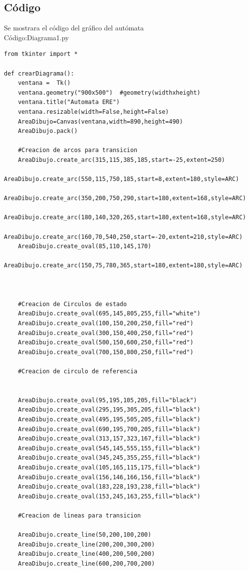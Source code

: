 \documentclass[12pt,letterpaper]{article}
\begin{document}
\subsection{C\'odigo}
Se mostrara el c\'odigo del gr\'afico del aut\'omata\\
C\'odigo:Diagrama1.py
\lstset{language=Python, breaklines=true, basicstyle=\footnotesize}
\begin{lstlisting}[frame=single]
from tkinter import *

def crearDiagrama():
	ventana =  Tk()
	ventana.geometry("900x500")  #geometry(widthxheight)
	ventana.title("Automata ERE")
	ventana.resizable(width=False,height=False)
	AreaDibujo=Canvas(ventana,width=890,height=490)
	AreaDibujo.pack()

	#Creacion de arcos para transicion
	AreaDibujo.create_arc(315,115,385,185,start=-25,extent=250)
	AreaDibujo.create_arc(550,115,750,185,start=8,extent=180,style=ARC)
	AreaDibujo.create_arc(350,200,750,290,start=180,extent=168,style=ARC)
	AreaDibujo.create_arc(180,140,320,265,start=180,extent=168,style=ARC)
	AreaDibujo.create_arc(160,70,540,250,start=-20,extent=210,style=ARC)
	AreaDibujo.create_oval(85,110,145,170)
	AreaDibujo.create_arc(150,75,780,365,start=180,extent=180,style=ARC)

	

	#Creacion de Circulos de estado
	AreaDibujo.create_oval(695,145,805,255,fill="white")
	AreaDibujo.create_oval(100,150,200,250,fill="red")
	AreaDibujo.create_oval(300,150,400,250,fill="red")
	AreaDibujo.create_oval(500,150,600,250,fill="red")
	AreaDibujo.create_oval(700,150,800,250,fill="red")
	
	#Creacion de circulo de referencia


	AreaDibujo.create_oval(95,195,105,205,fill="black")
	AreaDibujo.create_oval(295,195,305,205,fill="black")
	AreaDibujo.create_oval(495,195,505,205,fill="black")
	AreaDibujo.create_oval(690,195,700,205,fill="black")
	AreaDibujo.create_oval(313,157,323,167,fill="black")
	AreaDibujo.create_oval(545,145,555,155,fill="black")
	AreaDibujo.create_oval(345,245,355,255,fill="black")
	AreaDibujo.create_oval(105,165,115,175,fill="black")
	AreaDibujo.create_oval(156,146,166,156,fill="black")
	AreaDibujo.create_oval(183,228,193,238,fill="black")
	AreaDibujo.create_oval(153,245,163,255,fill="black")

	#Creacion de lineas para transicion

	AreaDibujo.create_line(50,200,100,200)
	AreaDibujo.create_line(200,200,300,200)
	AreaDibujo.create_line(400,200,500,200)
	AreaDibujo.create_line(600,200,700,200)



\end{lstlisting}
\end{document}
